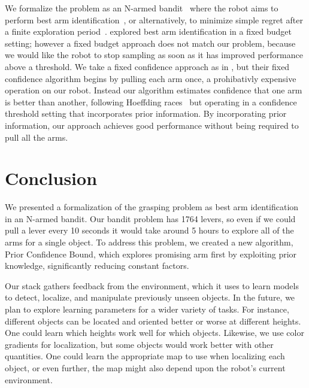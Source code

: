 \documentclass{article}
\newcommand{\stnote}[1]{\textcolor{blue}{\textbf{ST: #1}}}
\newcommand{\algorithmDTxt}{Prior Confidence Bound\xspace}
\begin{document}
We formalize the problem as an N-armed bandit~\citep{thompson33} where
the robot aims to perform best arm identification~\citep{audibert10,
  chen14}, or alternatively, to minimize simple regret after a finite
exploration period~\citep{bubeck09}.  \citet{audibert10} explored best
arm identification in a fixed budget setting; however a fixed budget
approach does not match our problem, because we would like the robot
to stop sampling as soon as it has improved performance above a
threshold.  We take a fixed confidence approach as in \citet{chen14},
but their fixed confidence algorithm begins by pulling each arm once,
a prohibativly expensive operation on our robot.  Instead our
algorithm estimates confidence that one arm is better than another,
following Hoeffding races~\citep{maron93} but operating in a confidence
threshold setting that incorporates prior information.  By
incorporating prior information, our approach achieves good
performance without being required to pull all the arms.


\section{Conclusion}

\label{sec:conclusion}


We presented a formalization of the grasping problem as best arm
identification in an N-armed bandit.  Our bandit problem has 1764
levers, so even if we could pull a lever every 10 seconds it would
take around 5 hours to explore all of the arms for a single object.
To address this problem, we created a new algorithm, \algorithmDTxt,
which explores promising arm first by exploiting prior knowledge,
significantly reducing constant factors. 

Our stack gathers feedback from the environment, which it uses to
learn models to detect, localize, and manipulate previously unseen
objects. In the future, we plan to explore learning parameters for a
wider variety of tasks.  For instance, different objects can be
located and oriented better or worse at different heights. One could
learn which heights work well for which objects.  Likewise, we use
color gradients for localization, but some objects would work better
with other quantities. One could learn the appropriate map to use when
localizing each object, or even further, the map might also depend
upon the robot's current environment.
\end{document}
